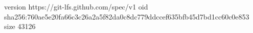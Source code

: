version https://git-lfs.github.com/spec/v1
oid sha256:760ae5e20fa66c3c26a2a5f82da0c8dc779ddccef635bfb45d7bd1cc60c0e853
size 43126
